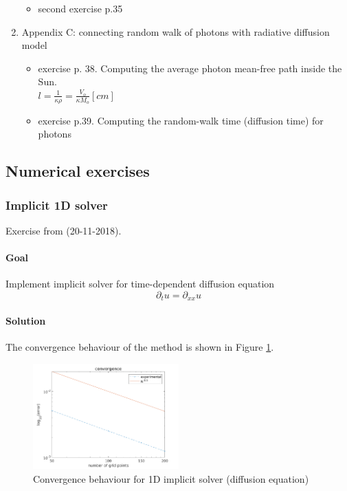 \documentclass[../main/main.tex]{subfiles}
\begin{document}
\begin{enumerate}
\begin{itemize}
\begin{itemize}
\end{itemize}

\item second exercise p.35
\end{itemize}

\item Appendix C: connecting random walk of photons with radiative diffusion model
\begin{itemize}
\item exercise p. 38. Computing the average photon mean-free path inside the Sun. \\
$l = \frac{1}{\kappa \rho} = \frac{V_o}{\kappa M_o} [cm]$

\item exercise p.39. Computing the random-walk time (diffusion time) for photons

\end{itemize}
\end{enumerate}

\newpage
\subsection{Numerical exercises}
\subsubsection{Implicit 1D solver}
Exercise from (20-11-2018).
\paragraph{Goal} Implement implicit solver for time-dependent diffusion equation
\begin{equation}
\partial_t u = \partial_{xx}u
\end{equation}
\paragraph{Solution}
The convergence behaviour of the method is shown in Figure \ref{1D_implicit_diffusion}.

\begin{figure}[!htp]
\centering
\includegraphics[width=0.5\textwidth]{../../introductory_exercises/diffusion_implicit_1D_solver/data/convergence.png}
\caption{Convergence behaviour for 1D implicit solver (diffusion equation)}
\label{1D_implicit_diffusion}
\end{figure}
\end{document}
